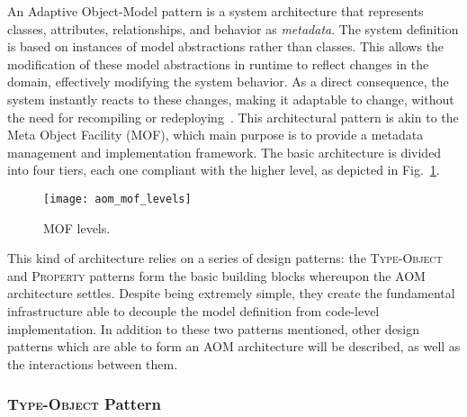 An Adaptive Object-Model pattern is a system architecture that represents classes, attributes, relationships, and behavior as \emph{metadata}. The system definition is based on instances of model abstractions rather than classes. This allows the modification of these model abstractions in runtime to reflect changes in the domain, effectively modifying the system behavior. As a direct consequence, the system instantly reacts to these changes, making it adaptable to change, without the need for recompiling or redeploying~\cite{YBJ01}. This architectural pattern is akin to the Meta Object Facility (MOF), which main purpose is to provide a metadata management and implementation framework. The basic architecture is divided into four tiers, each one compliant with the higher level\cite{mof}, as depicted in Fig.~\ref{fig:aom_mof_levels}.

\begin{figure}[H]
  \centering
  \texttt{[image: aom\_mof\_levels]}
  \caption{MOF levels.}
  \label{fig:aom_mof_levels}
\end{figure}


This kind of architecture relies on a series of design patterns: the \textsc{Type-Object} and \textsc{Property} patterns form the basic building blocks whereupon the AOM architecture settles. Despite being extremely simple, they create the fundamental infrastructure able to decouple the model definition from code-level implementation. In addition to these two patterns mentioned, other design patterns which are able to form an AOM architecture will be described, as well as the interactions between them.

\subsubsection{\textsc{Type-Object} Pattern}\label{sec:type-object_pattern}

